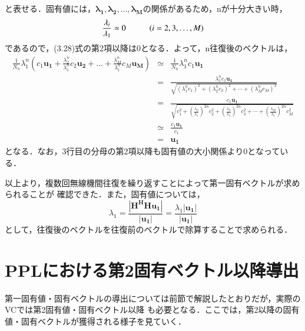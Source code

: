 と表せる．固有値には，$\bm{\lambda_1},\bm{\lambda_2},\ldots,\bm{\lambda_M}$の関係があるため，nが十分大きい時，
\begin{equation}
    \frac{\lambda_i}{\lambda_1} \simeq 0 \hspace{10mm} (i=2,3,\ldots,M)
\end{equation}
であるので，(3.28)式の第2項以降は0となる．よって，n往復後のベクトルは，
\begin{eqnarray}
    \frac{1}{N_n}\lambda_1^n\left(
        c_1\bm{u_1}+\frac{\lambda_2^n}{\lambda_1^n}c_2\bm{u_2}+\ldots+\frac{\lambda_M^n}{\lambda_1^n}c_M\bm{u_M}
    \right) &\simeq& \frac{1}{N_n}\lambda_1^nc_1\bm{u_1} \nonumber \\
    &=& \frac{\lambda_1^nc_1\bm{u_1}}{\sqrt{(\lambda_1^nc_1)^2+(\lambda_2^nc_2)^2+\cdots+(\lambda_M^nc_M)^2}} \nonumber \\
    &=& \frac{c_1\bm{u_1}}{\sqrt{ c_1^2 + \left(\frac{\lambda_2}{\lambda_1}\right)^{2n}c_2^2+\left(\frac{\lambda_3}{\lambda_1}\right)^{2n}c_3^2+\cdots+\left(\frac{\lambda_M}{\lambda_1}\right)^{2n}c_M^2}} \nonumber \\
    &\simeq& \frac{c_1\bm{u_1}}{c_1} \nonumber \\
    &=& \bm{u_1}
\end{eqnarray}
となる．なお，3行目の分母の第2項以降も固有値の大小関係より0となっている．

以上より，複数回無線機間往復を繰り返すことによって第一固有ベクトルが求められることが
確認できた．また，固有値については，
\begin{equation}
    \lambda_1 = \frac{\left|\bm{H^HHu_1}\right|}{\left|\bm{u_1}\right|} = \frac{\lambda_1\left|\bm{u_1}\right|}{\left|\bm{u_1}\right|}
\end{equation}
として，往復後のベクトルを往復前のベクトルで除算することで求められる．

\section{PPLにおける第2固有ベクトル以降導出}
第一固有値・固有ベクトルの導出については前節で解説したとおりだが，実際のVCでは第2固有値・固有ベクトル以降
も必要となる．ここでは，第2以降の固有値・固有ベクトルが獲得される様子を見ていく．

